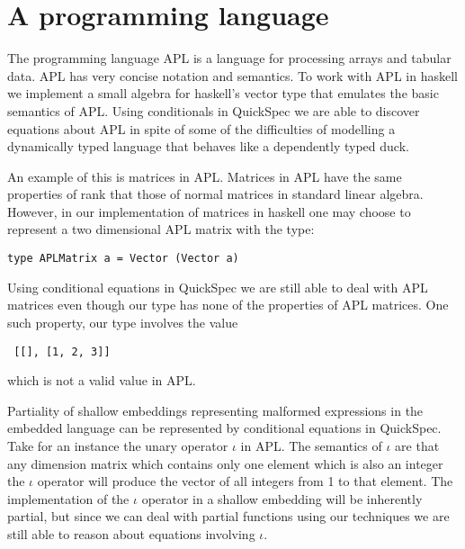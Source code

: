 \section{A programming language}
The programming language APL %
is a language for processing arrays and tabular data.
APL has very concise notation and semantics.
To work with APL in haskell we implement a small
algebra for haskell's vector type %
that emulates the basic semantics of APL.
Using conditionals in QuickSpec we are able to discover
equations about APL in spite of some of the
difficulties of modelling a dynamically typed language that 
behaves like a dependently typed duck.

An example of this is matrices in APL. Matrices in APL
have the same properties of rank that those of normal
matrices in standard linear algebra. However, in our implementation
of matrices in haskell one may choose to represent a two dimensional
APL matrix with the type:
\begin{verbatim}type APLMatrix a = Vector (Vector a)\end{verbatim}
Using conditional equations in QuickSpec we are still able to deal with
APL matrices even though our type has none of the properties of APL matrices.
One such property, our type involves the value \begin{verbatim} [[], [1, 2, 3]] \end{verbatim}
which is not a valid value in APL.

Partiality of shallow embeddings representing malformed expressions in the
embedded language can be represented by conditional equations in QuickSpec.
Take for an instance the unary operator $\iota$ in APL. The semantics
of $\iota$ are that any dimension matrix which contains only one element which is also
an integer the $\iota$ operator will produce the vector of all integers from 1 to that element.
The implementation of the $\iota$ operator in a shallow embedding will be inherently partial,
but since we can deal with partial functions using our techniques we are still able to reason
about equations involving $\iota$.
